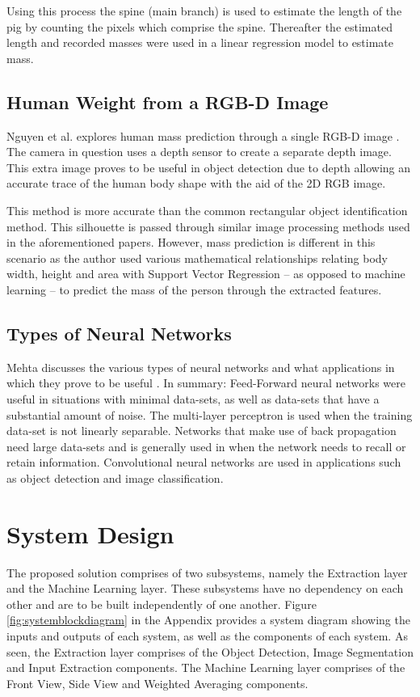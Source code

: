 Using this process the spine (main branch) is used to estimate the length of the pig by counting the pixels which comprise the spine.
Thereafter the estimated length and recorded masses were used in a linear regression model to estimate mass.
\subsection{Human Weight from a RGB-D Image}
Nguyen et al. explores human mass prediction through a single RGB-D image \cite{nguyen2014seeing}.
The camera in question uses a depth sensor to create a separate depth image. 
This extra image proves to be useful in object detection due to depth allowing an accurate trace of the human body shape with the aid of the 2D RGB image. 

This method is more accurate than the common rectangular object identification method. 
This silhouette is passed through similar image processing methods used in the aforementioned papers. 
However, mass prediction is different in this scenario as the author used various mathematical relationships relating body width, height and area with Support Vector Regression -- as opposed to machine learning -- to predict the mass of the person through the extracted features. 
\subsection{Types of Neural Networks}
Mehta discusses the various types of neural networks and what applications in which they prove to be useful \cite{mehta_2019}. 
In summary: Feed-Forward neural networks were useful in situations with minimal data-sets, as well as data-sets that have a substantial amount of noise.
The multi-layer perceptron is used when the training data-set is not linearly separable.
Networks that make use of back propagation need large data-sets and is generally used in when the network needs to recall or retain information.
Convolutional neural networks are used in applications such as object detection and image classification.
\section{System Design}
The proposed solution comprises of two subsystems, namely the Extraction layer and the Machine Learning layer.
These subsystems have no dependency on each other and are to be built independently of one another.
Figure \ref{fig:systemblockdiagram} in the Appendix provides a system diagram showing the inputs and outputs of each system, as well as the components of each system.
As seen, the Extraction layer comprises of the Object Detection, Image Segmentation and Input Extraction components.
The Machine Learning layer comprises of the Front View, Side View and Weighted Averaging components.
